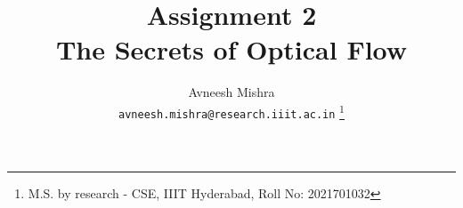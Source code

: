 

{
   \fancyhf{}
   \renewcommand{\headrulewidth}{0pt} %
}

\title{Assignment 2 \\
    \Large The Secrets of Optical Flow}

\author{
    Avneesh Mishra \\
    \texttt{avneesh.mishra@research.iiit.ac.in}
    \thanks{M.S. by research - CSE, IIIT Hyderabad, Roll No: 2021701032}
}


    \maketitle
    \thispagestyle{fancy_tr_rno}
    \tableofcontents
    \pagebreak
    
    \pagebreak
    \printbibliography

